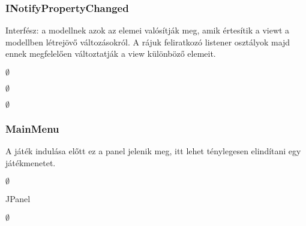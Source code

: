 \documentclass[../../projlab]{subfiles}
\begin{document}
\subsubsection{INotifyPropertyChanged}
\begin{class-template-responsibility}
    Interfész: a modellnek azok az elemei valósítják meg, amik értesítik a viewt a modellben létrejövő változásokról. A rájuk feliratkozó listener osztályok majd ennek megfelelően változtatják a view különböző elemeit.
\end{class-template-responsibility}
\begin{class-template-interface}
    $\emptyset$
\end{class-template-interface}
\begin{class-template-baseclass}
    $\emptyset$
\end{class-template-baseclass}
\begin{class-template-attribute}
    \item[] $\emptyset$
\end{class-template-attribute}
\begin{class-template-method}
\end{class-template-method}

\subsubsection{MainMenu}
\begin{class-template-responsibility}
    A játék indulása előtt ez a panel jelenik meg, itt lehet ténylegesen elindítani egy játékmenetet.
\end{class-template-responsibility}
\begin{class-template-interface}
    $\emptyset$
\end{class-template-interface}
\begin{class-template-baseclass}
    JPanel
\end{class-template-baseclass}
\begin{class-template-attribute}
    \item[] $\emptyset$
\end{class-template-attribute}
\begin{class-template-method}
\end{class-template-method}
\end{document}
